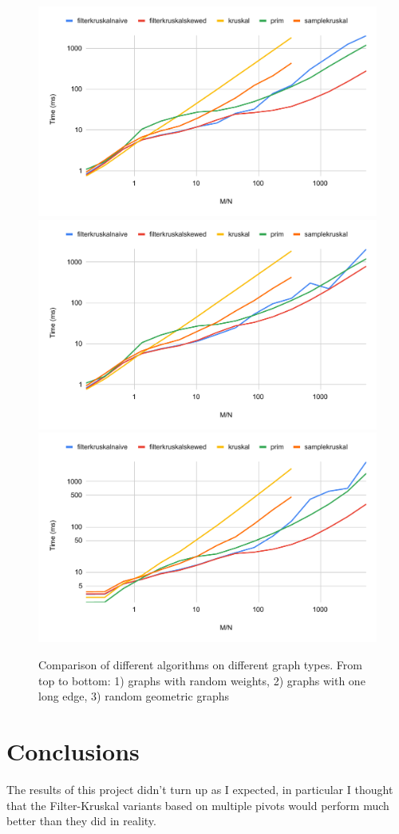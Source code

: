 \documentclass{article}
\begin{document}
\begin{figure}[htp]
    \centering
    \includegraphics[width=.7\linewidth]{images/randgraph.pdf}
    \includegraphics[width=.7\linewidth]{images/hardgraph.pdf}
    \includegraphics[width=.7\linewidth]{images/geomgraph.pdf}
    \caption{Comparison of different algorithms on different graph types. From top to bottom: 1) graphs with random weights, 2) graphs with one long edge, 3) random geometric graphs}
    \label{fig:rand}
\end{figure}

\section{Conclusions}

The results of this project didn't turn up as I expected, in particular I thought that the Filter-Kruskal variants based on multiple pivots would perform much better than they did in reality. 
\end{document}

